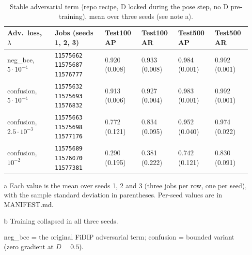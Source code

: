 \documentclass[10pt]{article}
\newcommand{\job}[1]{\texttt{#1}}
\begin{document}
\begin{table}[h]\centering\small
\begin{threeparttable}
\caption{Stable adversarial term (repo recipe, D locked during the pose step, no D pre-training), mean over three seeds (see note a).}
\begin{tabularx}{\linewidth}{X J l l l l}
\toprule
Adv.\ loss, $\lambda$ & Jobs (seeds 1, 2, 3) & Test100 AP & Test100 AR & Test500 AP & Test500 AR \\
\midrule
neg\_bce, $5\cdot10^{-4}$ & \job{11575662} \job{11575687} \job{11576777} & 0.920 (0.008) & 0.933 (0.008) & 0.984 (0.001) & 0.992 (0.001) \\
\addlinespace
confusion, $5\cdot10^{-4}$ & \job{11575632} \job{11575693} \job{11576832} & 0.913 (0.006) & 0.927 (0.004) & 0.983 (0.001) & 0.992 (0.001) \\
\addlinespace
confusion, $2.5\cdot10^{-3}$ & \job{11575663} \job{11575698} \job{11577176} & 0.772 (0.121) & 0.834 (0.095) & 0.952 (0.040) & 0.974 (0.022) \\
\addlinespace
confusion, $10^{-2}$ & \job{11575689} \job{11576070} \job{11577381} & 0.290 (0.195) & 0.381 (0.222) & 0.742 (0.121) & 0.830 (0.091) \\
\bottomrule
\end{tabularx}
\begin{tablenotes}\footnotesize
\item[a] Each value is the mean over seeds 1, 2 and 3 (three jobs per row, one per seed), with the sample standard deviation in parentheses. Per-seed values are in MANIFEST.md.
\item[b] Training collapsed in all three seeds.
\item neg\_bce = the original FiDIP adversarial term; confusion = bounded variant (zero gradient at $D=0.5$).
\end{tablenotes}
\end{threeparttable}
\end{table}
\end{document}
